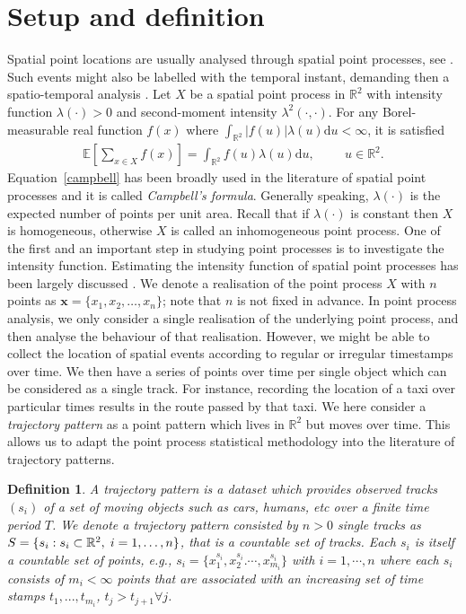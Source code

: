 \documentclass[article]{jss}
\newcommand{\R}{\mathbb{R}}
\newcommand{\ee}{\mathbb{E}}
\newcommand{\de}{\mathrm{d}}
\newtheorem{definition}{Definition}[section]
\begin{document}
\section{Setup and definition}\label{sec:setdef}
Spatial point locations are usually analysed through spatial point processes, see \cite{MW03,daley07,BRT15}. Such events might also be labelled with the temporal instant, demanding then a spatio-temporal analysis \citep{D13}. Let $X$ be a spatial point process in $\mathbb{R}^2$ with intensity function $\lambda(\cdot) >0$ and second-moment intensity $\lambda^2(\cdot,\cdot)$. For any Borel-measurable real function $f(x)$ where $\int_{\R^2} |f(u)|\lambda(u) \de u < \infty$, it is satisfied
\begin{eqnarray}\label{campbell}
\ee \left[\sum\limits_{x \in X} f(x)\right]=\int_{\R^2} f(u)\lambda(u) \de u, \hspace{1cm} u \in \R^2.
\end{eqnarray}
Equation~\ref{campbell} has been broadly used in the literature of spatial point processes and it is called \textit{Campbell's formula}. Generally speaking, $\lambda(\cdot) $ is the expected number of points per unit area. Recall that if $\lambda(\cdot)$ is constant then $X$ is homogeneous, otherwise $X$ is called an inhomogeneous point process. One of the first and an important step in studying point processes is to investigate the intensity function. Estimating the intensity function of spatial point processes has been largely discussed \citep{D85,jones93,CSKWM13}. We denote a realisation of the point process $X$ with $n$ points as $\mathbf{x}=\{x_1,x_2,\ldots,x_n \}$; note that $n$ is not fixed in advance. 
In point process analysis, we only consider a single realisation of the underlying point process, and then analyse the behaviour of that realisation. However, we might be able to collect the location of spatial events according to regular or irregular timestamps over time. We then have a series of points over time per single object which can be considered as a single track. For instance,  recording the location of a taxi over particular times results in the route passed by that taxi. We here consider a {\em trajectory pattern} as a point pattern which lives in $\R^2$ but moves over time. This allows us to adapt the point process statistical methodology into the literature of trajectory patterns.
  \begin{definition}
A \textit{trajectory pattern} is a dataset which provides observed 
tracks $(s_i)$ of a set of moving objects such as cars, humans, etc over a finite time period $T$. We denote a trajectory pattern consisted by $n>0$ single tracks as $S=\{s_i: s_i \subset \R^2, \hspace{1mm} i=1,\ldots,n  \}$, that is a countable set of tracks. Each $s_i$ is itself a countable set of points, e.g., $s_i=\{x_1^{s_i},x_2^{s_i}.\cdots, x_{m_i}^{s_i} \}$ with $i=1,\cdots,n$ where each $s_i$ consists of $m_i<\infty$ points that are associated with an increasing set of time stamps $t_1,...,t_{m_i}$, $t_j > t_{j+1} \forall j$.
\end{definition}
\end{document}
